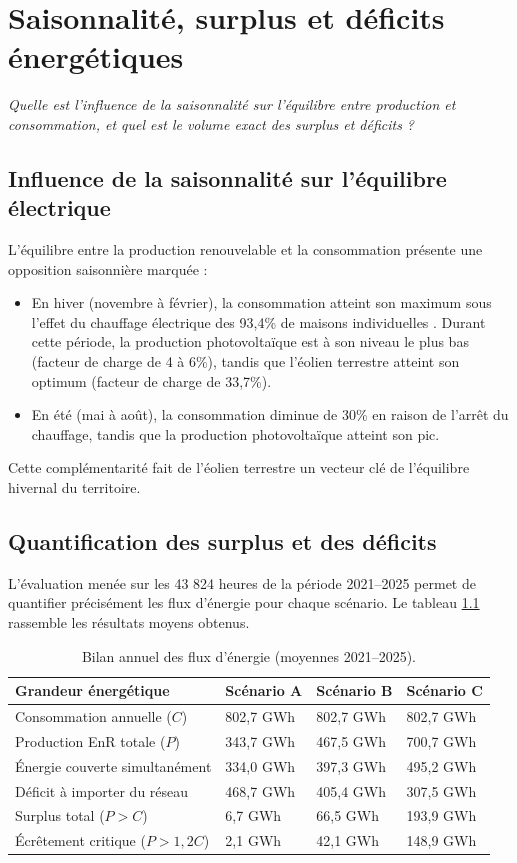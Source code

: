 \documentclass[12pt, a4paper]{report}
\begin{document}
\chapter{Saisonnalité, surplus et déficits énergétiques}

\emph{Quelle est l'influence de la saisonnalité sur l'équilibre entre production et consommation, et quel est le volume exact des surplus et déficits ?}

\section{Influence de la saisonnalité sur l'équilibre électrique}

L'équilibre entre la production renouvelable et la consommation présente une opposition saisonnière marquée :
\begin{itemize}
  \item En hiver (novembre à février), la consommation atteint son maximum sous l'effet du chauffage électrique des 93,4\% de maisons individuelles \cite{insee_rp}. Durant cette période, la production photovoltaïque est à son niveau le plus bas (facteur de charge de 4 à 6\%), tandis que l'éolien terrestre atteint son optimum (facteur de charge de 33,7\%).
  \item En été (mai à août), la consommation diminue de 30\% en raison de l'arrêt du chauffage, tandis que la production photovoltaïque atteint son pic.
\end{itemize}

Cette complémentarité fait de l'éolien terrestre un vecteur clé de l'équilibre hivernal du territoire.

\section{Quantification des surplus et des déficits}

L'évaluation menée sur les 43 824 heures de la période 2021--2025 permet de quantifier précisément les flux d'énergie pour chaque scénario. Le tableau \ref{tab:bilan_surplus_deficits} rassemble les résultats moyens obtenus.

\begin{table}[H]
\centering
\caption{Bilan annuel des flux d'énergie (moyennes 2021--2025).}
\label{tab:bilan_surplus_deficits}
\begin{tabularx}{\textwidth}{lXXX}
\toprule
Grandeur énergétique & Scénario A & Scénario B & Scénario C \\
\midrule
Consommation annuelle ($C$) & 802,7 GWh & 802,7 GWh & 802,7 GWh \\
Production EnR totale ($P$) & 343,7 GWh & 467,5 GWh & 700,7 GWh \\
Énergie couverte simultanément & 334,0 GWh & 397,3 GWh & 495,2 GWh \\
Déficit à importer du réseau & 468,7 GWh & 405,4 GWh & 307,5 GWh \\
Surplus total ($P > C$) & 6,7 GWh & 66,5 GWh & 193,9 GWh \\
Écrêtement critique ($P > 1,2 C$) & 2,1 GWh & 42,1 GWh & 148,9 GWh \\
\bottomrule
\end{tabularx}
\end{table}
\end{document}
